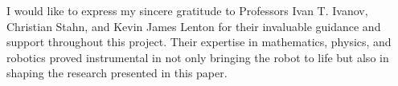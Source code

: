 I would like to express my sincere gratitude to Professors Ivan T. Ivanov, Christian Stahn, and Kevin James Lenton for their invaluable guidance and support throughout this project. Their expertise in mathematics, physics, and robotics proved instrumental in not only bringing the robot to life but also in shaping the research presented in this paper.